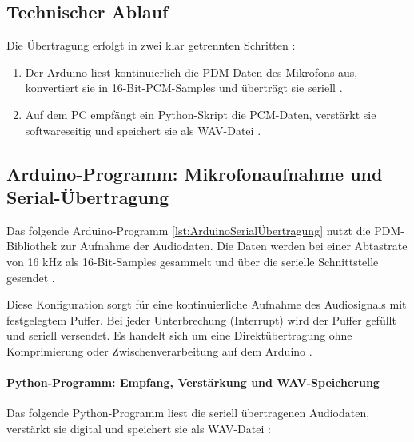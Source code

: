 \subsection{Technischer Ablauf}

Die Übertragung erfolgt in zwei klar getrennten Schritten \cite{Warden:2019}:

\begin{enumerate}
    \item Der Arduino liest kontinuierlich die PDM-Daten des Mikrofons aus, konvertiert sie in 16-Bit-PCM-Samples und überträgt sie seriell \cite{Warden:2019}.
    \item Auf dem PC empfängt ein Python-Skript die PCM-Daten, verstärkt sie softwareseitig und speichert sie als WAV-Datei \cite{Warden:2019}.
\end{enumerate}

\subsection{Arduino-Programm: Mikrofonaufnahme und Serial-Übertragung}

Das folgende Arduino-Programm \ref{lst:ArduinoSerialÜbertragung} nutzt die PDM-Bibliothek zur Aufnahme der Audiodaten. Die Daten werden bei einer Abtastrate von 16 kHz als 16-Bit-Samples gesammelt und über die serielle Schnittstelle gesendet \cite{Warden:2019}.

{
    \label{lst:ArduinoSerialÜbertragung}
}

Diese Konfiguration sorgt für eine kontinuierliche Aufnahme des Audiosignals mit festgelegtem Puffer. Bei jeder Unterbrechung (Interrupt) wird der Puffer gefüllt und seriell versendet. Es handelt sich um eine Direktübertragung ohne Komprimierung oder Zwischenverarbeitung auf dem Arduino \cite{Warden:2019}.

\paragraph{Python-Programm: Empfang, Verstärkung und WAV-Speicherung}

Das folgende Python-Programm liest die seriell übertragenen Audiodaten, verstärkt sie digital und speichert sie als WAV-Datei \cite{Warden:2019}:


{
    \label{lst:audio_recording}
}


